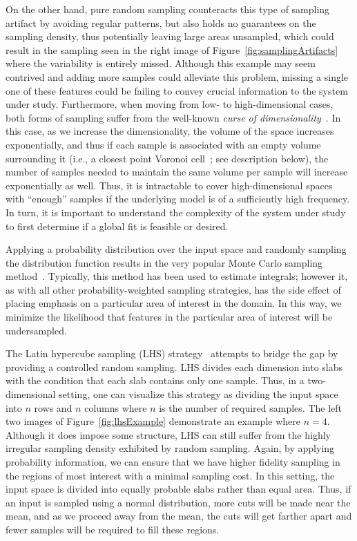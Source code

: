 On the other hand, pure random sampling counteracts this type of sampling artifact by avoiding regular patterns, but also holds no guarantees on the sampling density, thus potentially leaving large areas unsampled, which could result in the sampling seen in the right image of Figure~\ref{fig:samplingArtifacts} where the variability is entirely missed.
%
Although this example may seem contrived and adding more samples could alleviate this problem, missing a single one of these features could be failing to convey crucial information to the system under study.
%
Furthermore, when moving from low- to high-dimensional cases, both forms of sampling suffer from the well-known \emph{curse of dimensionality}~\cite{KeoghMueen2010}.
%
In this case, as we increase the dimensionality, the volume of the space increases exponentially, and thus if each sample is associated with an empty volume surrounding it (i.e., a closest point Voronoi cell~\cite{deBergCheongKreveld2008}; see description below), the number of samples needed to maintain the same volume per sample will increase exponentially as well.
%
Thus, it is intractable to cover high-dimensional spaces with ``enough'' samples if the underlying model is of a sufficiently high frequency.
%
In turn, it is important to understand the complexity of the system under study to first determine if a global fit is feasible or desired.

Applying a probability distribution over the input space and randomly sampling the distribution function results in the very popular Monte Carlo sampling method~\cite{MetropolisUlam1949}.
%
Typically, this method has been used to estimate integrals; however it, as with all other probability-weighted sampling strategies, has the side effect of placing emphasis on a particular area of interest in the domain.
%
In this way, we minimize the likelihood that features in the particular area of interest will be undersampled.

The Latin hypercube sampling (LHS) strategy~\cite{McKayBeckmanConover1979,Tang1993,VanDam2008} attempts to bridge the gap by providing a controlled random sampling.
%
LHS divides each dimension into slabs with the condition that each slab contains only one sample.
%
Thus, in a two-dimensional setting, one can visualize this strategy as dividing the input space into $n$ rows and $n$ columns where $n$ is the number of required samples.
%
The left two images of Figure~\ref{fig:lhsExample} demonstrate an example where $n=4$.
%
Although it does impose some structure, LHS can still suffer from the highly irregular sampling density exhibited by random sampling.
%
Again, by applying probability information, we can ensure that we have higher fidelity sampling in the regions of most interest with a minimal sampling cost.
%
In this setting, the input space is divided into equally probable slabs rather than equal area.
%
Thus, if an input is sampled using a normal distribution, more cuts will be made near the mean, and as we proceed away from the mean, the cuts will get farther apart and fewer samples will be required to fill these regions.

